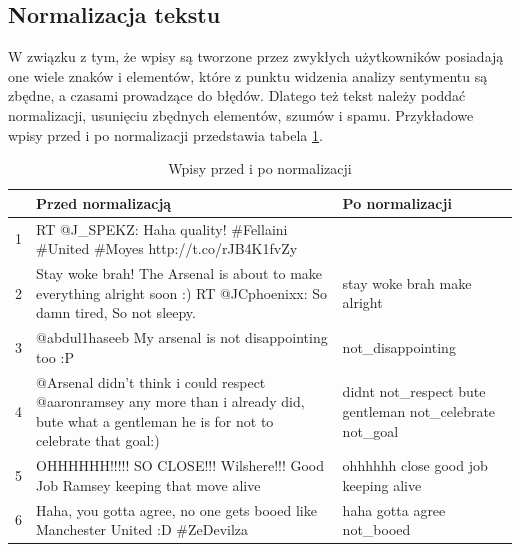 \subsection{Normalizacja tekstu}
\label{subsection:normalizacjatekstu}

W związku z tym, że wpisy są tworzone przez zwykłych użytkowników posiadają one
wiele znaków i elementów, które z punktu widzenia analizy sentymentu są zbędne,
a czasami prowadzące do błędów. Dlatego też tekst należy poddać normalizacji,
usunięciu zbędnych elementów, szumów i spamu. Przykładowe wpisy przed i po
normalizacji przedstawia tabela \ref{tab:wpisy-normalizacja}.


\begin{table}[ht!]  
\begin{center}  
\begin{tabular}{|r|p{70mm}|p{70mm}|}
\hline
 & Przed normalizacją & Po normalizacji
\\ \hline

1 
& RT @J\_SPEKZ: Haha quality! \#Fellaini \#United \#Moyes http://t.co/rJB4K1fvZy
& 

\\ \hline

2
& Stay woke brah! The Arsenal is about to make everything alright soon :) RT
@JCphoenixx: So damn tired, So not sleepy. 
& stay woke brah make alright

\\ \hline

3 
& @abdul1haseeb My arsenal is not disappointing too :P
& not\_disappointing
 
\\ \hline

4 
& @Arsenal didn't think i could respect @aaronramsey any more than i already
did, bute what a gentleman he is for not to celebrate that goal:) 
& didnt not\_respect bute gentleman not\_celebrate not\_goal

\\ \hline

5 
& OHHHHHH!!!!! SO CLOSE!!! Wilshere!!! Good Job Ramsey keeping that move alive
& ohhhhhh close good job keeping alive

\\ \hline

6 
& Haha, you gotta agree, no one gets booed like Manchester United :D \#ZeDevilza
& haha gotta agree not\_booed

\\ \hline
\end{tabular} 
\end{center} 
\caption{Wpisy przed i po normalizacji}
\label{tab:wpisy-normalizacja}
\end{table}

